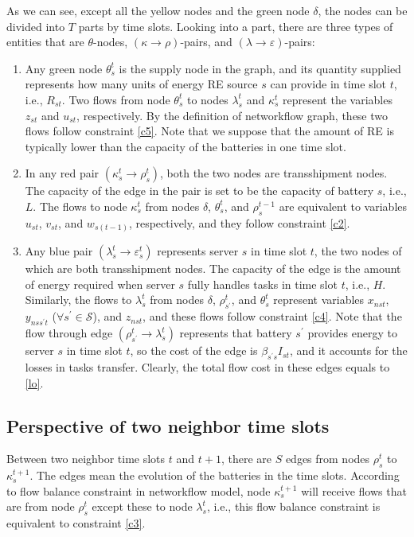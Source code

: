 \documentclass[conference, 10pt, ﬁnal, letterpaper, twocolumn]{IEEEtran}
\begin{document}
As we can see, except all the yellow nodes and the green node $\delta$, the nodes can be divided into $T$ parts by time slots. Looking into a part, there are three types of entities that are $\theta$-nodes, $(\kappa\rightarrow\rho)$-pairs, and $(\lambda\rightarrow\varepsilon)$-pairs:
\begin{enumerate}
    \item Any green node $\theta^{t}_{s}$ is the supply node in the graph, and its quantity supplied represents how many units of energy RE source $s$ can provide in time slot $t$, i.e., $R_{st}$. Two flows from node $\theta^{t}_{s}$ to nodes $\lambda^{t}_{s}$ and $\kappa^{t}_{s}$ represent the variables $z_{st}$ and $u_{st}$, respectively. By the definition of networkflow graph, these two flows follow constraint \eqref{c5}. Note that we suppose that the amount of RE is typically lower than the capacity of the batteries in one time slot. 
    \item In any red pair $(\kappa^{t}_{s}\rightarrow\rho^{t}_{s})$, both the two nodes are transshipment nodes. The capacity of the edge in the pair is set to be the capacity of battery $s$, i.e., $L$. The flows to node $\kappa^{t}_{s}$ from nodes $\delta$, $\theta^{t}_{s}$, and $\rho^{t-1}_{s}$ are equivalent to variables $u_{st}$, $v_{st}$, and $w_{s(t-1)}$, respectively, and they follow constraint \eqref{c2}.
    \item Any blue pair $(\lambda^{t}_{s}\rightarrow\varepsilon^{t}_{s})$ represents server $s$ in time slot $t$, the two nodes of which are both transshipment nodes. The capacity of the edge is the amount of energy required when server $s$ fully handles tasks in time slot $t$, i.e., $H$. Similarly, the flows to $\lambda^{t}_{s}$ from nodes $\delta$, $\rho^{t}_{s^\prime}$, and $\theta^{t}_{s}$ represent variables $x_{nst}$, $y_{nss^\prime t}$ ($\forall s^\prime \in \mathcal{S}$), and $z_{nst}$, and these flows follow constraint \eqref{c4}. Note that the flow through edge $(\rho^{t}_{s^\prime}\rightarrow\lambda^{t}_{s})$ represents that battery $s^\prime$ provides energy to server $s$ in time slot $t$, so the cost of the edge is $\beta_{s^\prime s} I_{st}$, and it accounts for the losses in tasks transfer. Clearly, the total flow cost in these edges equals to \eqref{lo}.
\end{enumerate}

\subsection{Perspective of two neighbor time slots}
Between two neighbor time slots $t$ and $t+1$, there are $S$ edges from nodes $\rho^{t}_{s}$ to $\kappa^{t+1}_{s}$. The edges mean the evolution of the batteries in the time slots. According to flow balance constraint in networkflow model, node $\kappa^{t+1}_{s}$ will receive flows that are from node $\rho^{t}_{s}$ except these to node $\lambda^{t}_{s}$, i.e., this flow balance constraint is equivalent to constraint \eqref{c3}.
\end{document}
